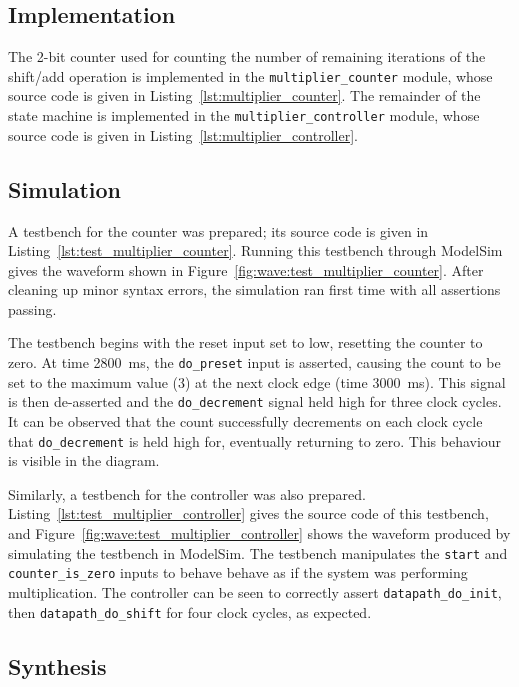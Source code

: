 \documentclass[a4paper]{article}
\begin{document}
\subsection{Implementation}
\label{sec:seq:impl}

The 2-bit counter used for counting the number of remaining iterations of the shift/add operation is implemented in the \texttt{multiplier\_counter} module, whose source code is given in Listing~\ref{lst:multiplier_counter}. The remainder of the state machine is implemented in the \texttt{multiplier\_controller} module, whose source code is given in Listing~\ref{lst:multiplier_controller}.

\subsection{Simulation}
\label{sec:seq:sim}

A testbench for the counter was prepared; its source code is given in Listing~\ref{lst:test_multiplier_counter}. Running this testbench through ModelSim gives the waveform shown in Figure~\ref{fig:wave:test_multiplier_counter}. After cleaning up minor syntax errors, the simulation ran first time with all assertions passing.

The testbench begins with the reset input set to low, resetting the counter to zero. At time \SI{2800}{\milli\second}, the \texttt{do\_preset} input is asserted, causing the count to be set to the maximum value (3) at the next clock edge (time \SI{3000}{\milli\second}). This signal is then de-asserted and the \texttt{do\_decrement} signal held high for three clock cycles. It can be observed that the count successfully decrements on each clock cycle that \texttt{do\_decrement} is held high for, eventually returning to zero. This behaviour is visible in the diagram.

Similarly, a testbench for the controller was also prepared. Listing~\ref{lst:test_multiplier_controller} gives the source code of this testbench, and Figure~\ref{fig:wave:test_multiplier_controller} shows the waveform produced by simulating the testbench in ModelSim. The testbench manipulates the \texttt{start} and \texttt{counter\_is\_zero} inputs to behave behave as if the system was performing multiplication. The controller can be seen to correctly assert \texttt{datapath\_do\_init}, then \texttt{datapath\_do\_shift} for four clock cycles, as expected.

\subsection{Synthesis}
\label{sec:seq:synth}
\end{document}
